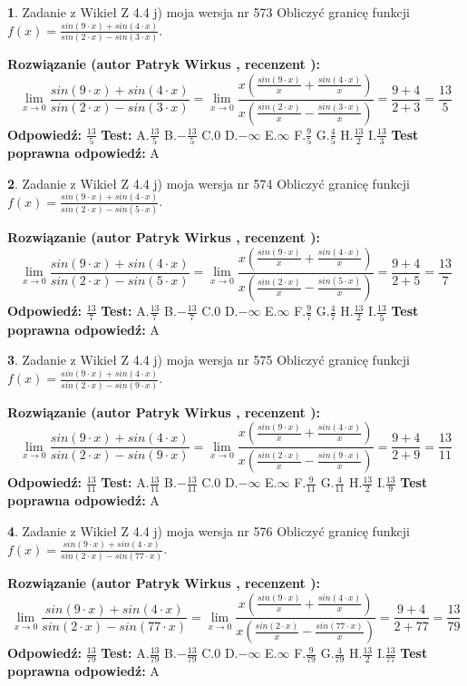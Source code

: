 \documentclass[12pt, a4paper]{article}
\theoremstyle{definition} %
\newtheorem{zad}{}
\newcommand{\zadStart}[1]{\begin{zad}#1\newline}
\newcommand{\zadStop}{\end{zad}}
\newcommand{\rozwStart}[2]{\noindent \textbf{Rozwiązanie (autor #1 , recenzent #2): }\newline}
\newcommand{\rozwStop}{\newline}
\newcommand{\odpStart}{\noindent \textbf{Odpowiedź:}\newline}
\newcommand{\odpStop}{\newline}
\newcommand{\testStart}{\noindent \textbf{Test:}\newline}
\newcommand{\testStop}{\newline}
\newcommand{\kluczStart}{\noindent \textbf{Test poprawna odpowiedź:}\newline}
\newcommand{\kluczStop}{\newline}
\begin{document}
\zadStart{Zadanie z Wikieł Z 4.4 j) moja wersja nr 573}
Obliczyć granicę funkcji $f(x)=\frac{sin(9\cdot x) +sin(4\cdot x)}{sin(2\cdot x) -sin(3\cdot x)}$.
\zadStop
\rozwStart{Patryk Wirkus}{}
$$\lim\limits_{x\to 0}\frac{sin(9\cdot x) +sin(4\cdot x)}{sin(2\cdot x) -sin(3\cdot x)}=\lim\limits_{x\to 0}\frac{x(\frac{sin(9\cdot x)}{x}+\frac{sin(4\cdot x)}{x})}{x(\frac{sin(2\cdot x)}{x}-\frac{sin(3\cdot x)}{x})}=\frac{9+4}{2+3} = \frac{13}{5}$$
\rozwStop
\odpStart
$\frac{13}{5}$
\odpStop
\testStart
A.$\frac{13}{5}$
B.$-\frac{13}{5}$
C.$0$
D.$-\infty$
E.$\infty$
F.$\frac{9}{5}$
G.$\frac{4}{5}$
H.$\frac{13}{2}$
I.$\frac{13}{3}$
\testStop
\kluczStart
A
\kluczStop



\zadStart{Zadanie z Wikieł Z 4.4 j) moja wersja nr 574}
Obliczyć granicę funkcji $f(x)=\frac{sin(9\cdot x) +sin(4\cdot x)}{sin(2\cdot x) -sin(5\cdot x)}$.
\zadStop
\rozwStart{Patryk Wirkus}{}
$$\lim\limits_{x\to 0}\frac{sin(9\cdot x) +sin(4\cdot x)}{sin(2\cdot x) -sin(5\cdot x)}=\lim\limits_{x\to 0}\frac{x(\frac{sin(9\cdot x)}{x}+\frac{sin(4\cdot x)}{x})}{x(\frac{sin(2\cdot x)}{x}-\frac{sin(5\cdot x)}{x})}=\frac{9+4}{2+5} = \frac{13}{7}$$
\rozwStop
\odpStart
$\frac{13}{7}$
\odpStop
\testStart
A.$\frac{13}{7}$
B.$-\frac{13}{7}$
C.$0$
D.$-\infty$
E.$\infty$
F.$\frac{9}{7}$
G.$\frac{4}{7}$
H.$\frac{13}{2}$
I.$\frac{13}{5}$
\testStop
\kluczStart
A
\kluczStop



\zadStart{Zadanie z Wikieł Z 4.4 j) moja wersja nr 575}
Obliczyć granicę funkcji $f(x)=\frac{sin(9\cdot x) +sin(4\cdot x)}{sin(2\cdot x) -sin(9\cdot x)}$.
\zadStop
\rozwStart{Patryk Wirkus}{}
$$\lim\limits_{x\to 0}\frac{sin(9\cdot x) +sin(4\cdot x)}{sin(2\cdot x) -sin(9\cdot x)}=\lim\limits_{x\to 0}\frac{x(\frac{sin(9\cdot x)}{x}+\frac{sin(4\cdot x)}{x})}{x(\frac{sin(2\cdot x)}{x}-\frac{sin(9\cdot x)}{x})}=\frac{9+4}{2+9} = \frac{13}{11}$$
\rozwStop
\odpStart
$\frac{13}{11}$
\odpStop
\testStart
A.$\frac{13}{11}$
B.$-\frac{13}{11}$
C.$0$
D.$-\infty$
E.$\infty$
F.$\frac{9}{11}$
G.$\frac{4}{11}$
H.$\frac{13}{2}$
I.$\frac{13}{9}$
\testStop
\kluczStart
A
\kluczStop



\zadStart{Zadanie z Wikieł Z 4.4 j) moja wersja nr 576}
Obliczyć granicę funkcji $f(x)=\frac{sin(9\cdot x) +sin(4\cdot x)}{sin(2\cdot x) -sin(77\cdot x)}$.
\zadStop
\rozwStart{Patryk Wirkus}{}
$$\lim\limits_{x\to 0}\frac{sin(9\cdot x) +sin(4\cdot x)}{sin(2\cdot x) -sin(77\cdot x)}=\lim\limits_{x\to 0}\frac{x(\frac{sin(9\cdot x)}{x}+\frac{sin(4\cdot x)}{x})}{x(\frac{sin(2\cdot x)}{x}-\frac{sin(77\cdot x)}{x})}=\frac{9+4}{2+77} = \frac{13}{79}$$
\rozwStop
\odpStart
$\frac{13}{79}$
\odpStop
\testStart
A.$\frac{13}{79}$
B.$-\frac{13}{79}$
C.$0$
D.$-\infty$
E.$\infty$
F.$\frac{9}{79}$
G.$\frac{4}{79}$
H.$\frac{13}{2}$
I.$\frac{13}{77}$
\testStop
\kluczStart
A
\kluczStop
\end{document}
